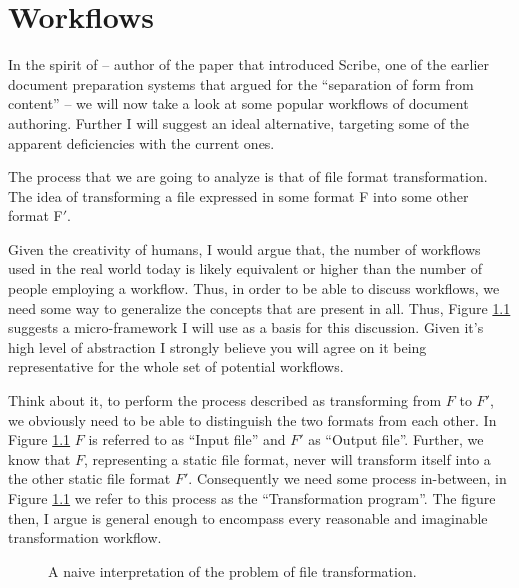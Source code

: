 \documentclass{scrreprt}
\newcommand*{\prim}{\ensuremath{\prime}} %
\begin{document}
\chapter{Workflows}
\label{sec:microframework}
In the spirit of \citet{reid} -- author of the paper that introduced Scribe, one of the earlier document preparation systems that argued for the ``separation of form from content'' -- we will now take a look at some popular workflows of document authoring. Further I will suggest an ideal alternative, targeting some of the apparent deficiencies with the current ones.

The process that we are going to analyze is that of file format transformation. The idea of transforming a file expressed in some format F into some other format F\prim.

Given the creativity of humans, I would argue that, the number of workflows used in the real world today is likely equivalent or higher than the number of people employing a workflow. Thus, in order to be able to discuss workflows, we need some way to generalize the concepts that are present in all. Thus, Figure \ref{fig:workflows-framework} suggests a micro-framework I will use as a basis for this discussion. Given it's high level of abstraction I strongly believe you will agree on it being representative for the whole set of potential workflows.

Think about it, to perform the process described as transforming from \(F\) to \(F\prime\), we obviously need to be able to distinguish the two formats from each other. In Figure \ref{fig:workflows-framework} \(F\) is referred to as ``Input file'' and \(F\prime\) as ``Output file''. Further, we know that \(F\), representing a static file format, never will transform itself into a the other static file format \(F\prime\). Consequently we need some process in-between, in Figure \ref{fig:workflows-framework} we refer to this process as the ``Transformation program''. The figure then, I argue is general enough to encompass every reasonable and imaginable transformation workflow.


\begin{figure}[h]
  \centering


  \caption{A naive interpretation of the problem of file transformation.}
  \label{fig:workflows-framework}
\end{figure}
\end{document}
